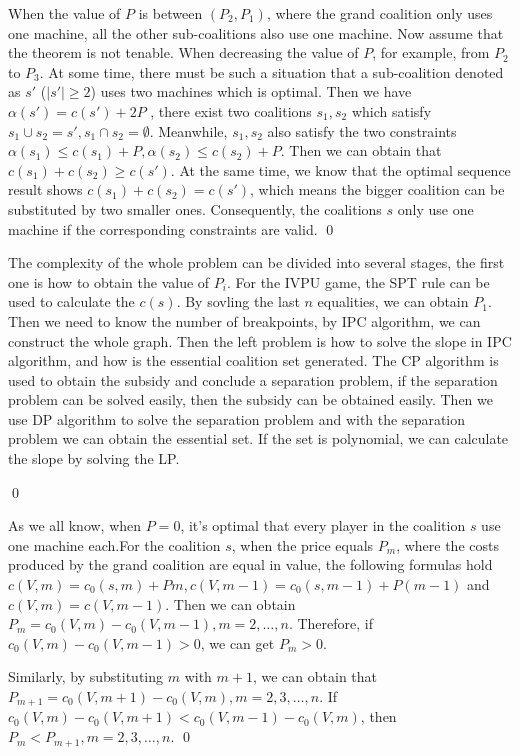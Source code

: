 \begin{pf}[Theorem 5]
When the value of $P$ is between $(P_2,P_1)$, where the grand coalition only uses one machine, all the other sub-coalitions also use one machine. Now assume that the theorem is not tenable. When decreasing the value of $P$, for example, from $P_2$ to $P_3$. At some time, there must be such a situation that a sub-coalition denoted as $s'$ ($|s'| \geq 2 $) uses two machines which is optimal. Then we have $ \alpha(s') = c(s') +2P $ , there exist two coalitions $s_1,s_2$ which satisfy $ s_1 \cup s_2 = s',s_1 \cap s_2 = \emptyset $.
Meanwhile, $s_1,s_2$ also satisfy the two constraints $\alpha(s_1) \leq c(s_1) + P , \alpha(s_2) \leq c(s_2) + P $. Then we can obtain that $ c(s_1) + c(s_2) \geq c(s') $. At the same time, we know that the optimal sequence result shows $ c(s_1) + c(s_2) = c(s') $, which means the bigger coalition can be substituted by two smaller ones. Consequently, the coalitions $s$ only use one machine if the corresponding constraints are valid.
\qed
\end{pf}

\begin{pf}[Theorem 6]
The complexity of the whole problem can be divided into several stages, the first one is how to obtain the value  of $P_i$. For the IVPU game, the SPT rule can be used to calculate the $c(s)$. By sovling the last $n$ equalities, we can obtain $P_1$. Then we need to know the number of breakpoints, by IPC algorithm, we can construct the whole graph. Then the left problem is how to solve the slope in IPC algorithm, and how is the essential coalition set generated. The CP algorithm is used to obtain the subsidy and conclude a separation problem, if the separation problem can be solved easily, then the subsidy can be obtained easily.
Then we use DP algorithm to solve the separation problem and with the separation problem we can obtain the essential set. If the set is polynomial, we can calculate the slope by solving the LP.

\qed
\end{pf}

\begin{pf}[Lemma 2\&3]
As we all know, when $ P=0 $, it's optimal that every player in the coalition $s$ use one machine each.For the coalition $s$, when the price equals $P_m$, where the costs produced by the grand coalition are equal in value, the following formulas hold
$c(V,m)=c_0(s,m)+Pm, c(V,m-1)=c_0(s,m-1)+P(m-1)$ and $c(V,m)=c(V,m-1)$. Then we can obtain $P_m = c_0(V,m)- c_0(V,m-1), m=2,\ldots,n$.
Therefore, if $ c_0(V,m)- c_0(V,m-1) > 0 $, we can get $P_m > 0$.

Similarly, by substituting $m$ with $m+1$, we can obtain that $P_{m+1} = c_0(V,m+1)- c_0(V,m), m=2,3,\ldots,n$. If $c_0 (V,m) - c_0 (V,m+1) < c_0 (V,m-1) - c_0 (V,m)$, then $P_m < P_{m+1}, m=2,3,\ldots,n$.
\qed
\end{pf}

